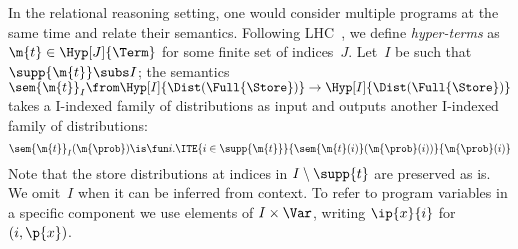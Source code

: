 In the relational reasoning setting, one would consider multiple
programs at the same time and relate their semantics.
Following LHC~\cite{d2022proving},
we define \emph{hyper-terms} as $ \m{t} \in \Hyp[J]{\Term} $
for some finite set of indices~$J$.
Let~$I$ be such that~$\supp{\m{t}} \subs I$; the semantics
$
  \sem{\m{t}}_I \from
      \Hyp[I]{\Dist(\Full{\Store})} \to \Hyp[I]{\Dist(\Full{\Store})}
$
takes a \pre I-indexed family of distributions as input and outputs
another \pre I-indexed family of distributions:
\[
  \sem{\m{t}}_I(\m{\prob}) \is
    \fun i.
    \ITE{i \in \supp{\m{t}}}{
      \sem{\m{t}(i)}(\m{\prob}(i))
    }{
      \m{\prob}(i)
    }
\]
Note that the store distributions at indices in $ I \setminus \supp{t} $
are preserved as is.
We omit~$I$ when it can be inferred from context.
To refer to program variables in a specific component we use
elements of $I\times \Var$, writing $\ip{x}{i}$ for $(i,\p{x})$.
